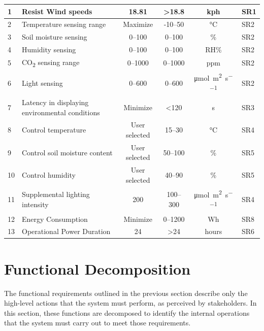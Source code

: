 \begin{ThreePartTable}
\begin{longtable}{|p{1.5cm}|p{4.5cm}|c|c|c|p{2.5cm}|}
		1  & Resist Wind speeds\tnote{1}                           & 18.81 & >18.8 & kph & SR1 \\ \hline
		2  & Temperature sensing range\tnote{2}                    & Maximize & -10--50 & °C & SR2 \\ \hline
		3  & Soil moisture sensing                                 & 0--100 & 0--100 & \% & SR2 \\ \hline
		4  & Humidity sensing                                      & 0--100 & 0--100 & RH\% & SR2 \\ \hline
		5  & CO\textsubscript{2} sensing range \tnote{3}           & 0--1000 & 0--1000 & ppm & SR2 \\ \hline
		6  & Light sensing\tnote{4}                                & 0--600 & 0--600 & \si{\micro\mole\per\metre\squared\per\second} & SR2 \\ \hline
		7  & Latency in displaying environmental conditions        & Minimize & <120 & s & SR3 \\ \hline
		8  & Control temperature\tnote{6}                          & User selected\tnote{5} & 15--30 & °C & SR4 \\ \hline
		9  & Control soil moisture content\tnote{7}                & User selected & 50--100 & \% & SR5 \\ \hline
		10 & Control humidity\tnote{8}                             & User selected & 40--90 & \% & SR5 \\ \hline
		11 & Supplemental lighting intensity\tnote{4}              & 200 & 100--300 & \si{\micro\mole\per\metre\squared\per\second} & SR4 \\ \hline
		12 & Energy Consumption\tnote{9}                           & Minimize & 0--1200 & Wh & SR8 \\ \hline
		13 & Operational Power Duration\tnote{10}                  & 24 & >24 & hours & SR6 \\ \hline
		
	\end{longtable}
\end{ThreePartTable}

\section{Functional Decomposition}

The functional requirements outlined in the previous section describe only the high-level actions that the system must perform, as perceived by stakeholders. In this section, these functions are decomposed to identify the internal operations that the system must carry out to meet those requirements.

